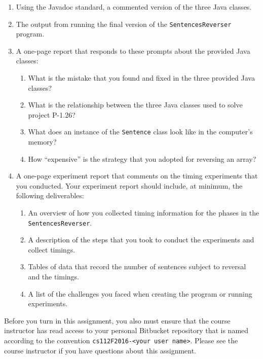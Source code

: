 \vspace*{-.05in}
\begin{enumerate}

  \itemsep 0em
  \item Using the Javadoc standard, a commented version of the three Java classes.

  \item The output from running the final version of the {\tt SentencesReverser} program.

  \item A one-page report that responds to these prompts about the provided Java classes:

    \vspace*{-.05in}
    \begin{enumerate}
      \itemsep 0em

      \item What is the mistake that you found and fixed in the three provided Java classes?

      \item What is the relationship between the three Java classes used to solve project P-1.26?

      \item What does an instance of the {\tt Sentence} class look like in the computer's memory?

      \item How ``expensive'' is the strategy that you adopted for reversing an array?

    \end{enumerate}

  \item A one-page experiment report that comments on the timing experiments that you conducted. Your experiment report
    should include, at minimum, the following deliverables:

    \vspace*{-.05in}
    \begin{enumerate}
      \itemsep 0em
      \item An overview of how you collected timing information for the phases in the {\tt  SentencesReverser}.
      \item A description of the steps that you took to conduct the experiments and collect timings.
      \item Tables of data that record the number of sentences subject to reversal and the timings.
      \item A list of the challenges you faced when creating the program or running experiments.
    \end{enumerate}

\end{enumerate}

\vspace*{-.05in}

Before you turn in this assignment, you also must ensure that the course instructor has read access to your personal
Bitbucket repository that is named according to the convention {\tt cs112F2016-<your user name>}. Please see the course
instructor if you have questions about this assignment.


